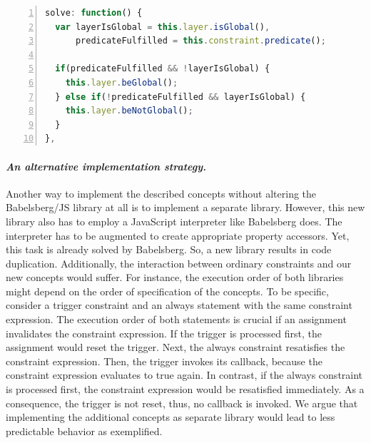 

\begin{lstlisting}[label=lst:implementation-activator,caption={The \texttt{solve} method of the \texttt{ActivatorSolver}},float,numbers=left,language=JavaScript,morekeywords={always}]
solve: function() {
  var layerIsGlobal = this.layer.isGlobal(),
      predicateFulfilled = this.constraint.predicate();

  if(predicateFulfilled && !layerIsGlobal) {
    this.layer.beGlobal();
  } else if(!predicateFulfilled && layerIsGlobal) {
    this.layer.beNotGlobal();
  }
},
\end{lstlisting}

\paragraph{\emph{An alternative implementation strategy.}}
Another way to implement the described concepts without altering the Babelsberg/JS library at all is to implement a separate library. 
However, this new library also has to employ a JavaScript interpreter like Babelsberg does. 
The interpreter has to be augmented to create appropriate property accessors. Yet, this task is already solved by Babelsberg. So, a new library results in code duplication.
Additionally, the interaction between ordinary constraints and our new concepts would suffer. For instance, the execution order of both libraries might depend on the order of specification of the concepts. To be specific, consider a trigger constraint and an always statement with the same constraint expression. The execution order of both statements is crucial if an assignment invalidates the constraint expression. If the trigger is processed first, the assignment would reset the trigger. Next, the always constraint resatisfies the constraint expression. Then, the trigger invokes its callback, because the constraint expression evaluates to true again. In contrast, if the always constraint is processed first, the constraint expression would be resatisfied immediately. As a consequence, the trigger is not reset, thus, no callback is invoked. We argue that implementing the additional concepts as separate library would lead to less predictable behavior as exemplified.

